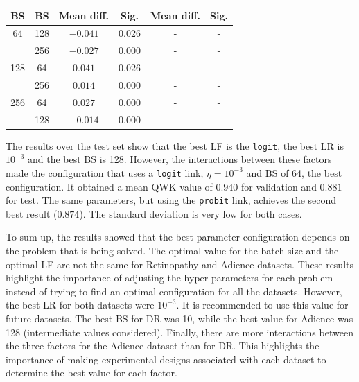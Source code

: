 \documentclass[journal]{IEEEtran}
\begin{document}
\begin{table}[!t]
{\begin{tabular}{cccccc}
			       BS         &        BS         & Mean diff. &        Sig.        & Mean diff. &          Sig.           \\ \hline
			       64         &        128        &  $-0.041$  &      $0.026$       &     -      &            -            \\
			                  &        256        &  $-0.027$  &      $0.000$       &     -      &            -            \\
			       128        &        64         &  $0.041$   &      $0.026$       &     -      &            -            \\
			                  &        256        &  $0.014$   &      $0.000$       &     -      &            -            \\
			       256        &        64         &  $0.027$   &      $0.000$       &     -      &            -            \\
			                  &        128        &  $-0.014$  &      $0.000$       &     -      &            -
		\end{tabular}}
	\end{table}
		
	The results over the test set show that the best LF is the \texttt{logit}, the best LR is $10^{-3}$ and the best BS is 128. However, the interactions between these factors made the configuration that uses a \texttt{logit} link, $\eta=10^{-3}$ and BS of 64, the best configuration. It obtained a mean QWK value of $0.940$ for validation and $0.881$ for test. The same parameters, but using the \texttt{probit} link, achieves the second best result ($0.874$). The standard deviation is very low for both cases.
	
	To sum up, the results showed that the best parameter configuration depends on the problem that is being solved. The optimal value for the batch size and the optimal LF are not the same for Retinopathy and Adience datasets. These results highlight the importance of adjusting the hyper-parameters for each problem instead of trying to find an optimal configuration for all the datasets. However, the best LR for both datasets were $10^{-3}$. It is recommended to use this value for future datasets. The best BS for DR was 10, while the best value for Adience was 128 (intermediate values considered). Finally, there are more interactions between the three factors for the Adience dataset than for DR. This highlights the importance of making experimental designs associated with each dataset to determine the best value for each factor.
	
\end{document}
